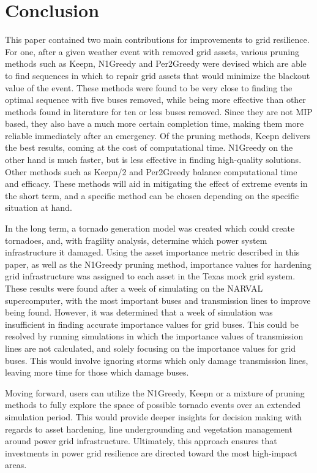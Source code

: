 \documentclass[12pt]{article}
\begin{document}
\newpage
\section{Conclusion}
This paper contained two main contributions for improvements to grid resilience. For one, after a given weather event with removed grid assets, various pruning methods such as Keepn, N1Greedy and Per2Greedy were devised which are able to find sequences in which to repair grid assets that would minimize the blackout value of the event. These methods were found to be very close to finding the optimal sequence with five buses removed, while being more effective than other methods found in literature for ten or less buses removed. Since they are not MIP based, they also have a much more certain completion time, making them more reliable immediately after an emergency. Of the pruning methods, Keepn delivers the best results, coming at the cost of computational time. N1Greedy on the other hand is much faster, but is less effective in finding high-quality solutions. Other methods such as Keepn/2 and Per2Greedy balance computational time and efficacy. These methods will aid in mitigating the effect of extreme events in the short term, and a specific method can be chosen depending on the specific situation at hand. \par
In the long term, a tornado generation model was created which could create tornadoes, and, with fragility analysis, determine which power system infrastructure it damaged. Using the asset importance metric described in this paper, as well as the N1Greedy pruning method, importance values for hardening grid infrastructure was assigned to each asset in the Texas mock grid system. These results were found after a week of simulating on the NARVAL supercomputer, with the most important buses and transmission lines to improve being found. However, it was determined that a week of simulation was insufficient in finding accurate importance values for grid buses. This could be resolved by running simulations in which the importance values of transmission lines are not calculated, and solely focusing on the importance values for grid buses. This would involve ignoring storms which only damage transmission lines, leaving more time for those which damage buses. \par
Moving forward, users can utilize the N1Greedy, Keepn or a mixture of pruning methods to fully explore the space of possible tornado events over an extended simulation period. This would provide deeper insights for decision making with regards to asset hardening, line undergrounding and vegetation management around power grid infrastructure. Ultimately, this approach ensures that investments in power grid resilience are directed toward the most high-impact areas. \par
\end{document}
